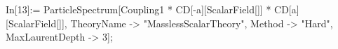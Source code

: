 In[13]:= ParticleSpectrum[Coupling1 * CD[-a][ScalarField[]] * CD[a][ScalarField[]], TheoryName -> "MasslessScalarTheory", Method -> "Hard", MaxLaurentDepth -> 3]; 
